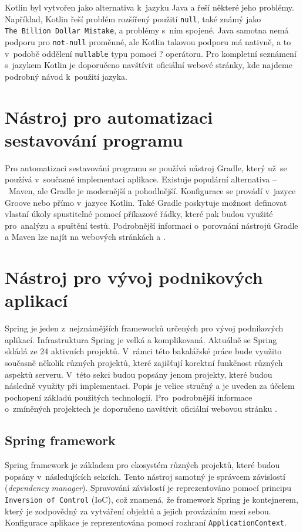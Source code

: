     Kotlin byl vytvořen jako alternativa k~jazyku Java a řeší některé jeho problémy. Například, Kotlin řeší problém rozšířený použití \texttt{null}, také známý jako \texttt{The~Billion~Dollar~Mistake}, a problémy s~ním spojené. Java samotna nemá podporu pro \texttt{not-null} proměnné, ale Kotlin takovou podporu má nativně, a to v~podobě oddělení \texttt{nullable} typu pomocí ? operátoru. Pro kompletní seznámení s~jazykem Kotlin je doporučeno navštívit oficiální webové stránky, kde najdeme podrobný návod k~použití jazyka.\cite{kotlin-documentation}
    

\section{Nástroj pro automatizaci sestavování programu}\label{resere:build}
    Pro automatizaci sestavování programu se používá nástroj Gradle, který už~se používá v~současné implementaci aplikace. Existuje populární alternativa --~Maven, ale Gradle je modernější a pohodlnější. Konfigurace se provádí v~jazyce Groove nebo přímo v~jazyce Kotlin. Také Gradle poskytuje možnost definovat vlastní úkoly spustitelné pomocí příkazové řádky, které pak budou využité pro~analýzu a spuštění testů. Podrobnější informaci o~porovnání nástrojů Gradle a Maven lze najít na webových stránkách \cite{grale-vs-mavem} a \cite{gradle-vs-maven-bealdung}.

\section{Nástroj pro vývoj podnikových aplikací}\label{resere:j2ee}
    Spring je jeden z~nejznámějších frameworků určených pro vývoj podnikových aplikací. Infrastruktura Spring je velká a komplikovaná. Aktuálně se Spring skládá ze 24 aktivních projektů. V~rámci této bakalářské práce bude využito současně několik různých projektů, které zajišťují korektní funkčnost různých aspektů serveru. V~této sekci budou popsány jenom projekty, které budou následně využity při implementaci. Popis je velice stručný a je uveden za účelem pochopení základů použitých technologií. Pro~podrobnější informace o~zmíněných projektech je doporučeno navštívit oficiální webovou stránku \cite{spring-projects}.
    
    \subsection{Spring framework}
        Spring framework je základem pro ekosystém různých projektů, které budou popsány v~následujících sekcích.\cite{spring-framework} Tento nástroj samotný je správcem závislostí (\textit{dependency manager}). Spravování závislostí je reprezentováno pomocí principu \texttt{Inversion of Control} (IoC), což znamená, že framework Spring je kontejnerem, který je zodpovědný za vytváření objektů a jejich provázáním mezi sebou. Konfigurace aplikace je reprezentována pomocí rozhraní \texttt{ApplicationContext}.
        
